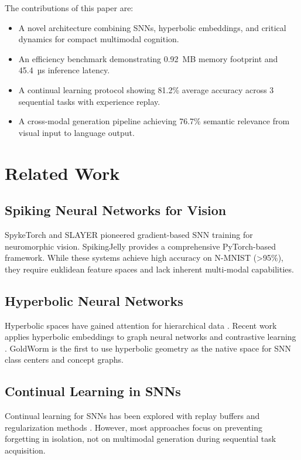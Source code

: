 \documentclass[conference]{IEEEtran}
\begin{document}
The contributions of this paper are:
\begin{itemize}
    \item A novel architecture combining SNNs, hyperbolic embeddings, and critical dynamics for compact multimodal cognition.
    \item An efficiency benchmark demonstrating 0.92~MB memory footprint and 45.4~µs inference latency.
    \item A continual learning protocol showing 81.2\% average accuracy across 3 sequential tasks with experience replay.
    \item A cross-modal generation pipeline achieving 76.7\% semantic relevance from visual input to language output.
\end{itemize}

\section{Related Work}

\subsection{Spiking Neural Networks for Vision}
SpykeTorch \cite{spiketorch} and SLAYER \cite{slayer} pioneered gradient-based SNN training for neuromorphic vision. SpikingJelly \cite{spikingjelly} provides a comprehensive PyTorch-based framework. While these systems achieve high accuracy on N-MNIST (>95\%), they require euklidean feature spaces and lack inherent multi-modal capabilities.

\subsection{Hyperbolic Neural Networks}
Hyperbolic spaces have gained attention for hierarchical data \cite{hyperbolic_nn}. Recent work applies hyperbolic embeddings to graph neural networks \cite{hyperbolic_gnn} and contrastive learning \cite{hyperbolic_cl}. GoldWorm is the first to use hyperbolic geometry as the native space for SNN class centers and concept graphs.

\subsection{Continual Learning in SNNs}
Continual learning for SNNs has been explored with replay buffers \cite{snn_replay} and regularization methods \cite{snn_ewc}. However, most approaches focus on preventing forgetting in isolation, not on multimodal generation during sequential task acquisition.
\end{document}
